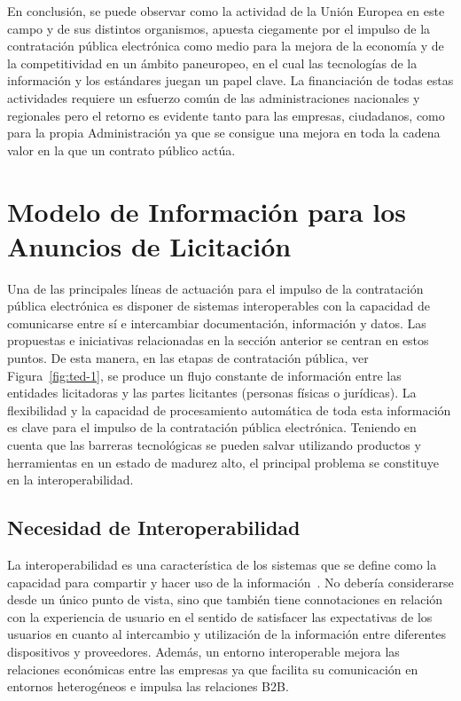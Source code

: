 En conclusión, se puede observar como la actividad de la Unión Europea en este campo y de sus distintos organismos, 
apuesta ciegamente por el impulso de la contratación pública electrónica como medio para la mejora de la economía
y de la competitividad en un ámbito paneuropeo, en el cual las tecnologías de la información y los estándares 
juegan un papel clave. La financiación de todas estas actividades requiere un esfuerzo común de las administraciones
nacionales y regionales pero el retorno es evidente tanto para las empresas, ciudadanos, como para la propia
Administración ya que se consigue una mejora en toda la cadena valor en la que un contrato público actúa.

\section{Modelo de Información para los Anuncios de Licitación}
Una de las principales líneas de actuación para el impulso de la contratación
pública electrónica es disponer de sistemas interoperables con la capacidad de
comunicarse entre sí e intercambiar documentación, información y datos. Las propuestas
e iniciativas relacionadas en la sección anterior se centran en estos puntos. De
esta manera, en las etapas de contratación pública, ver Figura~\ref{fig:ted-1}, se produce un flujo constante de información entre las entidades
licitadoras y las partes licitantes (personas físicas o jurídicas). La flexibilidad y la capacidad
de procesamiento automática de toda esta información es clave para el impulso de la contratación
pública electrónica. Teniendo en cuenta que las barreras tecnológicas se pueden salvar utilizando
productos y herramientas en un estado de madurez alto, el principal problema se constituye en la interoperabilidad.

\subsection{Necesidad de Interoperabilidad}
La interoperabilidad es una característica de los sistemas que se define como la capacidad para compartir y hacer uso de la
información~\cite{interoperability}. No debería considerarse desde un único punto de vista, 
sino que también tiene connotaciones en relación con la experiencia de usuario en el
sentido de satisfacer las expectativas de los usuarios en cuanto al intercambio
y utilización de la información entre diferentes dispositivos y proveedores.
Además, un entorno interoperable mejora las relaciones económicas entre las
empresas ya que facilita su comunicación en entornos heterogéneos e impulsa las
relaciones \gls{B2B}.


